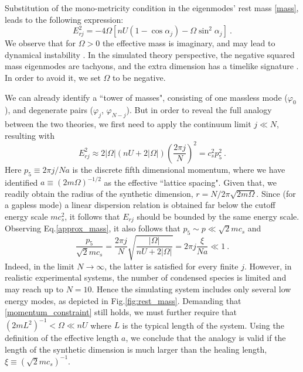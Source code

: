 \documentclass[aps,prl,twocolumn,unsortedaddress,superscriptaddress]{revtex4-1}
\begin{document}
Substitution of the mono-metricity condition in the eigenmodes' rest mass \eqref{mass}, leads to the following expression:
\begin{equation}\label{rest_mass}
E_{rj}^{2}=-4\Omega\left[nU\left(1-\cos\alpha_j\right)-\Omega\sin^2\alpha_j\right]~.
\end{equation}
We observe that for $\Omega>0$ the effective mass is imaginary, and may lead to dynamical instability \cite{pitaevskii2003}. In the simulated theory perspective, the negative squared mass eigenmodes are tachyons, and the extra dimension has a timelike signature \cite{bailin1987kk}. In order to avoid it, we set $\Omega$ to be negative.



We can already identify a ``tower of masses", consisting of one massless mode ($\varphi_0$), and degenerate pairs ($\varphi_j$, $\varphi_{N-j}$).
But in order to reveal the full analogy between the two theories, we first need to apply the continuum limit $j\ll N$, resulting with
\begin{equation}\label{approx_mass}
E_{rj}^{2}\approx 2\left|\Omega\right|\left(nU+2\left|\Omega\right|\right)\left(\frac{2\pi  j}{N}\right)^{2}= c_s^{2}p_5^{2}~.
\end{equation}
Here $p_5\equiv 2\pi j/Na$ is the discrete fifth dimensional momentum, where we have identified $a\equiv (2m\Omega)^{-1/2}$ as the effective ``lattice spacing".
Given that, we readily obtain the radius of the synthetic dimension, $r=N/2\pi\sqrt{2m\Omega}$.
Since (for a gapless mode) a linear dispersion relation is obtained far below the cutoff energy scale $mc_s^{2}$, it follows that $E_{rj}$ should be bounded by the same energy scale. Observing Eq.\eqref{approx_mass}, it also follows that $p_5\sim p\ll \sqrt{2}mc_s$ and
\begin{equation}\label{momentum_constraint}
\frac{p_5}{\sqrt{2}mc_s}=\frac{2\pi j}{N}\sqrt{\frac{|\Omega|}{nU+2|\Omega|}}=2\pi j\frac{\xi}{Na}\ll 1~.
\end{equation}
Indeed, in the limit $N\rightarrow\infty$, the latter is satisfied for every finite $j$.
However, in realistic experimental systems, the number of condensed species is limited and may reach up to $N=10$. Hence the simulating system includes only several low energy modes, as depicted in Fig.\ref{fig:rest_mass}.
Demanding that \eqref{momentum_constraint} still holds, we must further require that $(2mL^{2})^{-1}<\Omega\ll nU$ where $L$ is the typical length of the system. Using the definition of the effective length $a$, we conclude that the analogy is valid if the length of the synthetic dimension is much larger than the healing length, $\xi\equiv (\sqrt{2}mc_s)^{-1}$.
\end{document}
